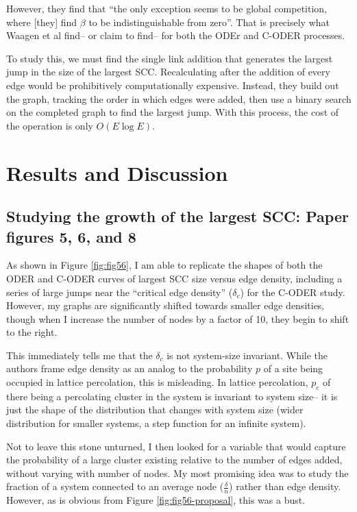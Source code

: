\documentclass[11pt, oneside]{article}   	%
\begin{document}
However, they find that ``the only exception seems to be global competition, where [they] find $\beta$ to be indistinguishable from zero''. That is precisely what Waagen et al find-- or claim to find-- for both the ODEr and C-ODER processes.

To study this, we must find the single link addition that generates the largest jump in the size of the largest SCC. Recalculating after the addition of every edge would be prohibitively computationally expensive. Instead, they build out the graph, tracking the order in which edges were added, then use a binary search on the completed graph to find the largest jump. With this process, the cost of the operation is only $O(E\log{E})$.

\section{Results and Discussion}

\subsection{Studying the growth of the largest SCC: Paper figures 5, 6, and 8}

As shown in Figure \ref{fig:fig56}, I am able to replicate the shapes of both the ODER and C-ODER curves of largest SCC size versus edge density, including a series of large jumps near the ``critical edge density'' ($\delta_c$) for the C-ODER study. However, my graphs are significantly shifted towards smaller edge densities, though when I increase the number of nodes by a factor of 10, they begin to shift to the right.

This immediately tells me that the $\delta_c$ is not system-size invariant. While the authors frame edge density as an analog to the probability $p$ of a site being occupied in lattice percolation, this is misleading. In lattice percolation, $p_c$ of there being a percolating cluster in the system is invariant to system size-- it is just the shape of the distribution that changes with system size (wider distribution for smaller systems, a step function for an infinite system).

Not to leave this stone unturned, I then looked for a variable that would capture the probability of a large cluster existing relative to the number of edges added, without varying with number of nodes. My most promising idea was to study the fraction of a system connected to an average node ($\frac{\delta}{n}$) rather than edge density. However, as is obvious from Figure \ref{fig:fig56-proposal}, this was a bust.
\end{document}
